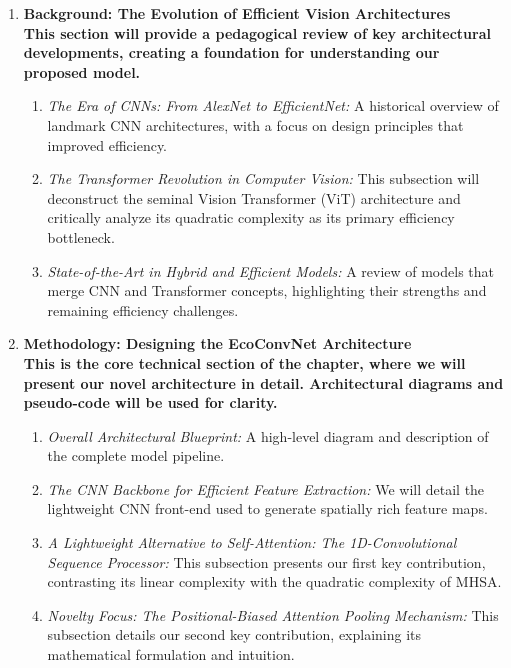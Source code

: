 \documentclass[12pt, a4paper]{article}
\begin{document}
\begin{enumerate}
    \item \large\bfseries Background: The Evolution of Efficient Vision Architectures \\
    \normalfont This section will provide a pedagogical review of key architectural developments, creating a foundation for understanding our proposed model.
    \begin{enumerate}
        \item \textit{The Era of CNNs: From AlexNet to EfficientNet:} A historical overview of landmark CNN architectures, with a focus on design principles that improved efficiency.
        \item \textit{The Transformer Revolution in Computer Vision:} This subsection will deconstruct the seminal Vision Transformer (ViT) architecture and critically analyze its quadratic complexity as its primary efficiency bottleneck.
        \item \textit{State-of-the-Art in Hybrid and Efficient Models:} A review of models that merge CNN and Transformer concepts, highlighting their strengths and remaining efficiency challenges.
    \end{enumerate}
    
    \item \large\bfseries Methodology: Designing the EcoConvNet Architecture \\
    \normalfont This is the core technical section of the chapter, where we will present our novel architecture in detail. Architectural diagrams and pseudo-code will be used for clarity.
    \begin{enumerate}
        \item \textit{Overall Architectural Blueprint:} A high-level diagram and description of the complete model pipeline.
        \item \textit{The CNN Backbone for Efficient Feature Extraction:} We will detail the lightweight CNN front-end used to generate spatially rich feature maps.
        \item \textit{A Lightweight Alternative to Self-Attention: The 1D-Convolutional Sequence Processor:} This subsection presents our first key contribution, contrasting its linear complexity with the quadratic complexity of MHSA.
        \item \textit{Novelty Focus: The Positional-Biased Attention Pooling Mechanism:} This subsection details our second key contribution, explaining its mathematical formulation and intuition.
    \end{enumerate}


\end{enumerate}
\end{document}
